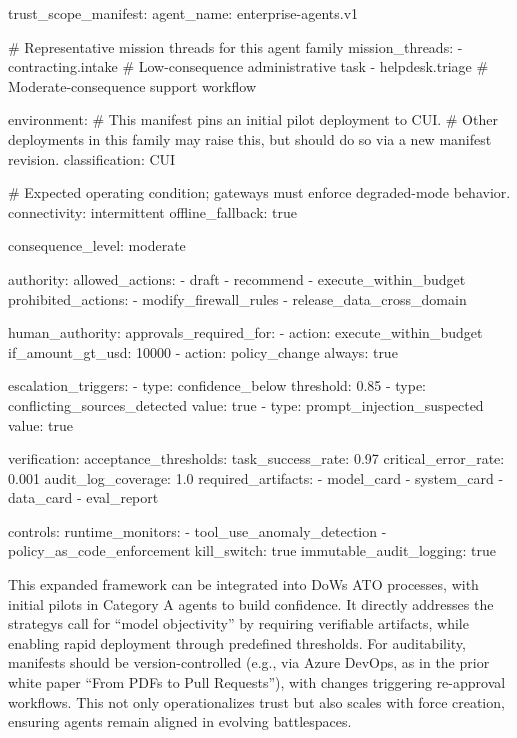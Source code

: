 \documentclass[11pt]{article}
\begin{document}
\begin{yamlblock}
trust_scope_manifest:
  agent_name: enterprise-agents.v1

  # Representative mission threads for this agent family
  mission_threads:
    - contracting.intake      # Low-consequence administrative task
    - helpdesk.triage         # Moderate-consequence support workflow

  environment:
    # This manifest pins an initial pilot deployment to CUI.
    # Other deployments in this family may raise this, but should do so via a new manifest revision.
    classification: CUI

    # Expected operating condition; gateways must enforce degraded-mode behavior.
    connectivity: intermittent
    offline_fallback: true

  consequence_level: moderate

  authority:
    allowed_actions:
      - draft
      - recommend
      - execute_within_budget
    prohibited_actions:
      - modify_firewall_rules
      - release_data_cross_domain

  human_authority:
    approvals_required_for:
      - action: execute_within_budget
        if_amount_gt_usd: 10000
      - action: policy_change
        always: true

    escalation_triggers:
      - type: confidence_below
        threshold: 0.85
      - type: conflicting_sources_detected
        value: true
      - type: prompt_injection_suspected
        value: true

  verification:
    acceptance_thresholds:
      task_success_rate: 0.97
      critical_error_rate: 0.001
      audit_log_coverage: 1.0
    required_artifacts:
      - model_card
      - system_card
      - data_card
      - eval_report

  controls:
    runtime_monitors:
      - tool_use_anomaly_detection
      - policy_as_code_enforcement
    kill_switch: true
    immutable_audit_logging: true
\end{yamlblock}

This expanded framework can be integrated into DoW\textquotesingle s ATO processes, with initial pilots in Category A agents to build confidence. It directly addresses the strategy\textquotesingle s call for ``model objectivity'' by requiring verifiable artifacts, while enabling rapid deployment through predefined thresholds. For auditability, manifests should be version-controlled (e.g., via Azure DevOps, as in the prior white paper ``From PDFs to Pull Requests''), with changes triggering re-approval workflows. This not only operationalizes trust but also scales with force creation, ensuring agents remain aligned in evolving battlespaces.
\end{document}
